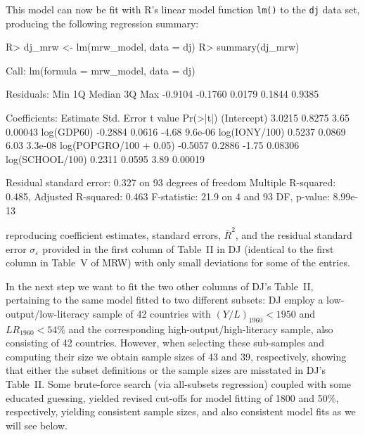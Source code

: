 \documentclass[10pt,a4paper,twoside]{article}
\let\code=\texttt
\let\proglang=\textsf
\newenvironment{Schunk}{}{}
\begin{document}
%
This model can now be fit with \proglang{R}'s linear model
function \code{lm()} to the \code{dj} data set, producing the following regression
summary:
%
\begin{Schunk}
\begin{Sinput}
R> dj_mrw <- lm(mrw_model, data = dj)
R> summary(dj_mrw)
\end{Sinput}
\begin{Soutput}
Call:
lm(formula = mrw_model, data = dj)

Residuals:
    Min      1Q  Median      3Q     Max 
-0.9104 -0.1760  0.0179  0.1844  0.9385 

Coefficients:
                       Estimate Std. Error t value Pr(>|t|)
(Intercept)              3.0215     0.8275    3.65  0.00043
log(GDP60)              -0.2884     0.0616   -4.68  9.6e-06
log(IONY/100)            0.5237     0.0869    6.03  3.3e-08
log(POPGRO/100 + 0.05)  -0.5057     0.2886   -1.75  0.08306
log(SCHOOL/100)          0.2311     0.0595    3.89  0.00019

Residual standard error: 0.327 on 93 degrees of freedom
Multiple R-squared: 0.485,	Adjusted R-squared: 0.463 
F-statistic: 21.9 on 4 and 93 DF,  p-value: 8.99e-13 
\end{Soutput}
\end{Schunk}
%
reproducing coefficient estimates, standard errors, $\bar R^2$, and the
residual standard error $\sigma_\varepsilon$ provided in the first column of Table~II 
in DJ (identical to the first column in Table~V of MRW) with only small deviations 
for some of the entries.  



In the next step we want to fit the two other columns of DJ's Table~II, pertaining to
the same model fitted to two different subsets: DJ employ a low-output/low-literacy
sample of 42 countries with $(Y/L)_{1960} < 1950$ and $\mathit{LR}_{1960} < 54\%$ and
the corresponding high-output/high-literacy sample, also consisting of 42 countries. 
However, when selecting these sub-samples and computing their size we obtain
sample sizes of 43 and 39, respectively,
showing that either the subset definitions or the sample sizes are misstated in 
DJ's Table~II.  Some brute-force search (via all-subsets regression) coupled 
with some educated guessing, yielded revised 
cut-offs for model fitting of 1800 and 50\%,
respectively, yielding consistent sample sizes, 
and also consistent model fits as we will see below.
\end{document}
